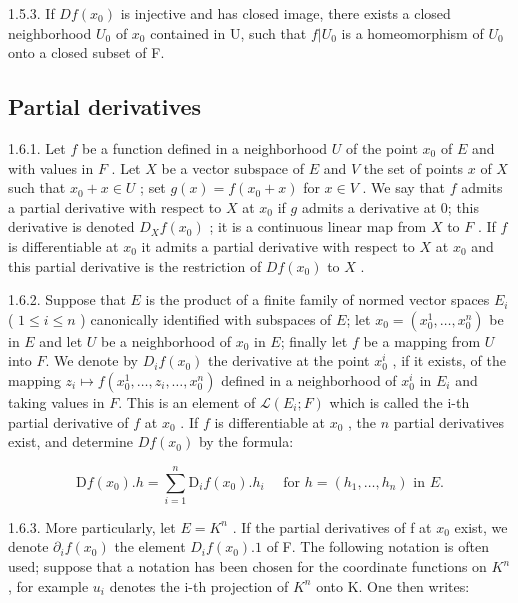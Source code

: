 1.5.3. If \(Df(x_{0})\) is injective and has closed image, there exists a closed neighborhood \(U_{0}\) of \(x_{0}\) contained in U, such that \(f|U_{0}\) is a homeomorphism of \(U_{0}\) onto a closed subset of F.

\subsection{Partial derivatives}

1.6.1. Let \(f\) be a function defined in a neighborhood \(U\) of the point \(x_0\) of \(E\) and with values in \(F\) . Let \(X\) be a vector subspace of \(E\) and \(V\) the set of points \(x\) of \(X\) such that \(x_0 + x \in U\) ; set \(g(x) = f(x_0 + x)\) for \(x \in V\) . We say that \(f\) admits a partial derivative with respect to \(X\) at \(x_0\) if \(g\) admits a derivative at 0; this derivative is denoted \(D_X f(x_0)\) ; it is a continuous linear map from \(X\) to \(F\) . If \(f\) is differentiable at \(x_0\) it admits a partial derivative with respect to \(X\) at \(x_0\) and this partial derivative is the restriction of \(Df(x_0)\) to \(X\) .

1.6.2. Suppose that \(E\) is the product of a finite family of normed vector spaces \(E_{i}\) ( \(1 \leqslant i \leqslant n\) ) canonically identified with subspaces of \(E\); let \(x_{0} = (x_{0}^{1}, \ldots, x_{0}^{n})\) be in \(E\) and let \(U\) be a neighborhood of \(x_{0}\) in \(E\); finally let \(f\) be a mapping from \(U\) into \(F\). We denote by \(D_{i}f(x_{0})\) the derivative at the point \(x_{0}^{i}\) , if it exists, of the mapping \(z_{i} \mapsto f(x_{0}^{1}, \ldots, z_{i}, \ldots, x_{0}^{n})\) defined in a neighborhood of \(x_{0}^{i}\) in \(E_{i}\) and taking values in \(F\). This is an element of \(\mathcal{L}(E_{i}; F)\) which is called the i-th partial derivative of \(f\) at \(x_{0}\) . If \(f\) is differentiable at \(x_{0}\) , the \(n\) partial derivatives exist, and determine \(Df(x_{0})\) by the formula:

\[
\mathrm{D} f (x _ {0}). h = \sum_ {i = 1} ^ {n} \mathrm{D} _ {i} f (x _ {0}). h _ {i} \quad \text { for } h = (h _ {1}, \dots , h _ {n}) \text { in } E.
\]

1.6.3. More particularly, let \(E = K^{n}\) . If the partial derivatives of f at \(x_{0}\) exist, we denote \(\partial_{i}f(x_{0})\) the element \(D_{i}f(x_{0}).1\) of F. The following notation is often used; suppose that a notation has been chosen for the coordinate functions on \(K^{n}\) , for example \(u_{i}\) denotes the i-th projection of \(K^{n}\) onto K. One then writes:


